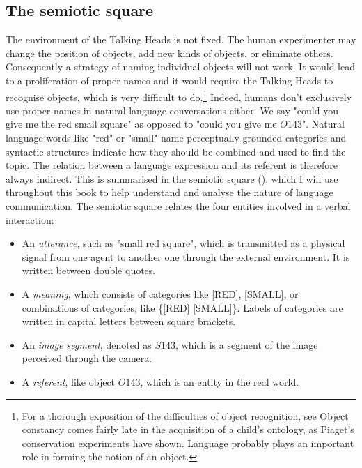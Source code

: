 \subsection{The semiotic square}

The environment of the Talking Heads is 
not fixed. The human experimenter 
may change the position of objects, add new kinds of 
objects, or eliminate
others. Consequently a strategy of naming individual objects
will not work. It would lead to a proliferation of 
proper names and it would require the Talking Heads to
recognise objects, which is very difficult to do.\footnote{
For a thorough exposition of the difficulties of 
object recognition, see \cite{Ullman:1996}
Object constancy comes fairly late in the 
acquisition of a child's ontology, as Piaget's conservation
experiments have shown. Language probably plays an important
role in forming the notion of an object.}
Indeed, humans don't exclusively use proper names in 
natural language conversations 
either. We say "could you give me the red small square" as 
opposed to "could you give me $O143$". Natural language 
words like "red" or "small" name perceptually grounded categories
and syntactic structures indicate how they should
be combined and used to find the topic. The relation between 
a language expression and its referent is therefore 
always indirect. This is summarised
in the semiotic square (), which I will use throughout this book to 
help understand and analyse the nature of language communication. 
The semiotic square relates the four entities
involved in a verbal interaction: 
\begin{itemize}
\item An {\it utterance}, such as "small red square", which is 
transmitted as a physical 
signal from one agent to another one through the 
external environment. It is written between double quotes. 
\item A {\it meaning}, which consists of categories like [RED], [SMALL], 
or combinations of categories, like \{[RED] [SMALL]\}. Labels of 
categories are written in capital letters between 
square brackets. 
\item An {\it image segment}, denoted as $S143$, which is 
a segment of the image perceived through the camera.
\item A {\it referent}, like object $O143$, which is 
an entity in the real world. 
\end{itemize}

